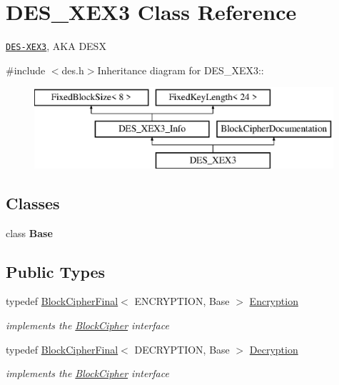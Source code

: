 \hypertarget{class_d_e_s___x_e_x3}{
\section{DES\_\-XEX3 Class Reference}
\label{class_d_e_s___x_e_x3}
}


\href{http://www.weidai.com/scan-mirror/cs.html#DESX}{\tt DES-\/XEX3}, AKA DESX  


{\ttfamily \#include $<$des.h$>$}Inheritance diagram for DES\_\-XEX3::\begin{figure}[H]
\begin{center}
\leavevmode
\includegraphics[height=3cm]{class_d_e_s___x_e_x3}
\end{center}
\end{figure}
\subsection*{Classes}
\begin{DoxyCompactItemize}
\item 
class {\bfseries Base}
\end{DoxyCompactItemize}
\subsection*{Public Types}
\begin{DoxyCompactItemize}
\item 
\hypertarget{class_d_e_s___x_e_x3_ab354fbe2c7cec4ee5de37b35df8a01ae}{
typedef \hyperlink{class_block_cipher_final}{BlockCipherFinal}$<$ ENCRYPTION, Base $>$ \hyperlink{class_d_e_s___x_e_x3_ab354fbe2c7cec4ee5de37b35df8a01ae}{Encryption}}
\label{class_d_e_s___x_e_x3_ab354fbe2c7cec4ee5de37b35df8a01ae}

\begin{DoxyCompactList}\small\item\em implements the \hyperlink{class_block_cipher}{BlockCipher} interface \item\end{DoxyCompactList}\item 
\hypertarget{class_d_e_s___x_e_x3_a0bf70a14613af7b76e40eb12fe2fb534}{
typedef \hyperlink{class_block_cipher_final}{BlockCipherFinal}$<$ DECRYPTION, Base $>$ \hyperlink{class_d_e_s___x_e_x3_a0bf70a14613af7b76e40eb12fe2fb534}{Decryption}}
\label{class_d_e_s___x_e_x3_a0bf70a14613af7b76e40eb12fe2fb534}

\begin{DoxyCompactList}\small\item\em implements the \hyperlink{class_block_cipher}{BlockCipher} interface \item\end{DoxyCompactList}\end{DoxyCompactItemize}


